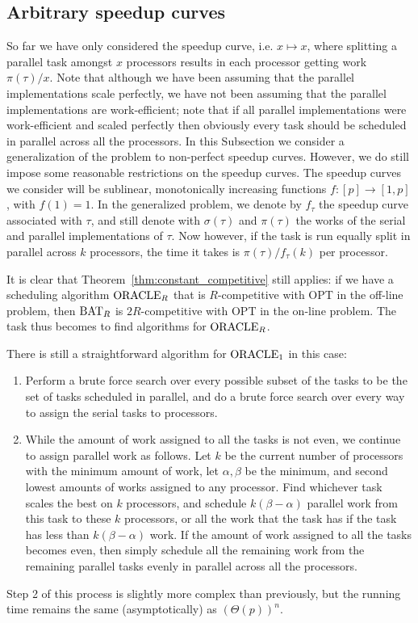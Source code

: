 \subsection{Arbitrary speedup curves} 
So far we have only considered the  speedup curve,
i.e. $x\mapsto x$, where splitting a parallel task amongst $x$
processors results in each processor getting work $\pi(\tau)/x$.
Note that although we have been assuming that the parallel
implementations scale perfectly, we have not been assuming that
the parallel implementations are work-efficient; note that if all
parallel implementations were work-efficient and scaled perfectly
then obviously every task should be scheduled in parallel across
all the processors. In this Subsection we consider a
generalization of the problem to non-perfect speedup curves.
However, we do still impose some reasonable restrictions on the
speedup curves. The speedup curves we consider will be sublinear,
monotonically increasing functions $f: [p] \to [1,p]$, with $f(1)
= 1$. In the generalized problem, we denote by $f_\tau$ the
speedup curve associated with $\tau$, and still denote with
$\sigma(\tau)$ and $\pi(\tau)$ the works of the serial and
parallel implementations of $\tau$. Now however, if the task is
run equally split in parallel across $k$ processors, the time it
takes is $\pi(\tau) / f_\tau(k)$ per processor.

It is clear that Theorem~\ref{thm:constant_competitive} still
applies: if we have a scheduling algorithm $\operatorname{\text{ORACLE}}_R$ that is
$R$-competitive with OPT in the off-line problem, then $\operatorname{\text{BAT}}_R$
is $2R$-competitive with OPT in the on-line problem. The task
thus becomes to find algorithms for $\operatorname{\text{ORACLE}}_R$.

There is still a straightforward algorithm for $\operatorname{\text{ORACLE}}_1$ in
this case:
\begin{enumerate}
  \item Perform a brute force search over every
possible subset of the tasks to be the set of tasks scheduled in
parallel, and do a brute force search over every way to assign
the serial tasks to processors. 

\item While the amount of work assigned to all the tasks is not
  even, we continue to assign parallel work as follows. Let $k$
  be the current number of processors with the minimum amount of
  work, let $\alpha, \beta$ be the minimum, and second lowest
  amounts of works assigned to any processor. Find whichever task
  scales the best on $k$ processors, and schedule $k(\beta -
  \alpha)$ parallel work from this task to these $k$ processors,
  or all the work that the task has if the task has less than
  $k(\beta-\alpha)$ work. If the amount of work assigned to all
  the tasks becomes even, then simply schedule all the remaining
  work from the remaining parallel tasks evenly in parallel
  across all the processors.
\end{enumerate}
Step 2 of this process is slightly more complex than previously,
but the running time remains the same (asymptotically) as
$(\Theta(p))^n$.

